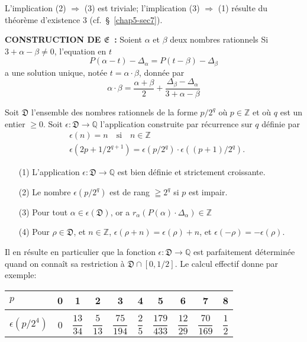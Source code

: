 L'implication (2) $\Rightarrow$ (3) est triviale; l'implication (3)
$\Rightarrow$ (1) r\'esulte du th\'eor\`eme d'existence 3 (cf.~\S\ \ref{chap5-sec7}).

\smallskip
\noindent
{\bf CONSTRUCTION DE $\mathfrak{E}$~:}
Soient $\alpha$ et $\beta$ deux nombres rationnels Si
$3+\alpha-\beta\neq 0$, l'equation en $t$
$$
P(\alpha-t)-\Delta_{\alpha}=P(t-\beta)-\Delta_{\beta}
$$
a une solution unique, not\'ee $t=\alpha\cdot \beta$, donn\'ee par
$$
\alpha\cdot\beta
=\dfrac{\alpha+\beta}{2}+\dfrac{\Delta_{\beta}-\Delta_{\alpha}}{3+\alpha-\beta} 
$$\pageoriginale

Soit $\mathfrak{D}$ l'ensemble des nombres rationnels de la forme
$p/2^{q}$ o\`u $p\in \mathbb{Z}$ et o\`u $q$ est un entier $\geq
0$. Soit $\epsilon:\mathfrak{D}\to \mathbb{Q}$ l'application
construite par r\'ecurrence sur $q$ d\'efinie par
\begin{align*}
& \epsilon(n)=n\text{~~ si~~ } n\in \mathbb{Z}\\
& \epsilon(2p+1/2^{q+1})=\epsilon(p/2^{q})\cdot \epsilon((p+1)/2^{q}).
\end{align*}

\begin{proposition}\label{chap5-prop5}
\begin{itemize}
\item[\rm(1)] L'application $\epsilon:\mathfrak{D}\to \mathbb{Q}$ est
bien d\'efinie et strictement croissante.

\item[\rm(2)] Le nombre $\epsilon(p/2^{q})$ est de rang $\geqq 2^{q}$
si $p$ est impair.

\item[\rm(3)] Pour tout $\alpha\in \epsilon(\mathfrak{D})$, or a
$r_{\alpha}(P(\alpha)\cdot \Delta_{\alpha})\in \mathbb{Z}$

\item[\rm(4)] Pour $\rho\in \mathfrak{D}$, et $n\in \mathbb{Z}$,
$\epsilon(\rho+n)=\epsilon(\rho)+n$, et
$\epsilon(-\rho)=-\epsilon(\rho)$. 
\end{itemize}
\end{proposition}

Il en r\'esulte en particulier que la fonction
$\epsilon:\mathfrak{D}\to \mathbb{Q}$ est parfaitement d\'etermin\'ee
quand on conna\^it sa restriction \`a $\mathfrak{D}\cap [0,1/2]$. Le
calcul effectif donne par exemple:
\begin{center}
\begin{tabular}{l|ccccccccc}
$p$ & 0 & 1 & 2 & 3 & 4 & 5 & 6 & 7 & 8\\
\hline
&&\\[-10pt]
$\epsilon(p/2^{4})$ & 0 & $\dfrac{13}{34}$ & $\dfrac{5}{13}$ &
$\dfrac{75}{194}$ & $\dfrac{2}{5}$ & $\dfrac{179}{433}$ &
$\dfrac{12}{29}$ & $\dfrac{70}{169}$ & $\dfrac{1}{2}$ 
\end{tabular}
\end{center}

